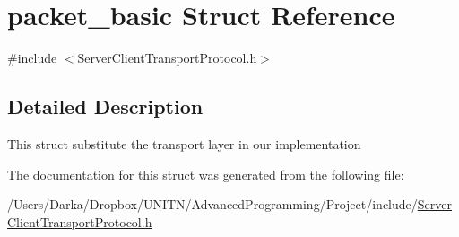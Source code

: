 \hypertarget{structpacket__basic}{}\section{packet\+\_\+basic Struct Reference}
\label{structpacket__basic}


{\ttfamily \#include $<$Server\+Client\+Transport\+Protocol.\+h$>$}



\subsection{Detailed Description}
This struct substitute the transport layer in our implementation 

The documentation for this struct was generated from the following file\+:\begin{DoxyCompactItemize}
\item 
/\+Users/\+Darka/\+Dropbox/\+U\+N\+I\+T\+N/\+Advanced\+Programming/\+Project/include/\hyperlink{_server_client_transport_protocol_8h}{Server\+Client\+Transport\+Protocol.\+h}\end{DoxyCompactItemize}
